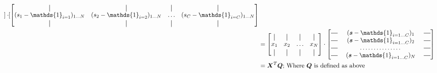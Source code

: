 \documentclass{article}
\newcommand*{\vertbar}{\rule[-1ex]{0.5pt}{2.5ex}}
\newcommand*{\horzbar}{\rule[.5ex]{2.5ex}{0.5pt}}
\begin{document}
\begin{subequations}
\begin{equation}
\begin{aligned}[t]
\begin{bmatrix}
            \end{bmatrix} \cdot
            \begin{bmatrix}
                \vertbar & \vertbar & \vertbar & \vertbar \\
                (s_{1}-\mathds{1}_{i=1})_{1 \dots N} & (s_{2}-\mathds{1}_{i=2})_{1 \dots N} & \hdots & (s_{C}-\mathds{1}_{i=C})_{1 \dots N} \\
                \vertbar & \vertbar & \vertbar & \vertbar
            \end{bmatrix}\\ &=
            \begin{bmatrix}
                \vertbar & \vertbar & \vertbar & \vertbar \\
                x_{1}    & x_{2}    & \hdots & x_{N} \\
                \vertbar & \vertbar & \vertbar & \vertbar
            \end{bmatrix} \cdot
            \begin{bmatrix}
                \horzbar \ &(\boldsymbol{s} - \mathds{1}_{i=1 \dots C})_{1} &\ \horzbar \\
                \horzbar \ &(\boldsymbol{s} - \mathds{1}_{i=1 \dots C})_{2} &\ \horzbar \\
                \horzbar \ & \dots\dots\dots\dots\dots & \ \horzbar \\
                \horzbar \ &(\boldsymbol{s} - \mathds{1}_{i=1 \dots C})_{N} &\ \horzbar \\
            \end{bmatrix}\\ &=
            \boldsymbol{X}^{T}\boldsymbol{Q} \text{; Where $\boldsymbol{Q}$ is defined as above}
        \end{aligned}
    \end{equation}
\end{subequations}
\end{document}
